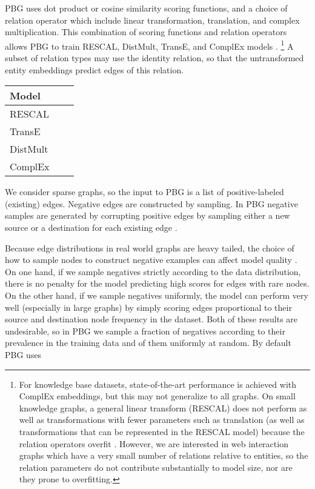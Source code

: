 \documentclass{article}
\begin{document}
PBG uses dot product or cosine similarity scoring functions, and a choice of relation operator  which include linear transformation, translation, and complex multiplication. This combination of scoring functions and relation operators allows PBG to train RESCAL, DistMult, TransE, and ComplEx models \cite{nickel2011three,yang2014embedding,transE,trouillon2016complex}. \footnote{For knowledge base datasets, state-of-the-art performance is achieved with ComplEx embeddings, but this may not generalize to all graphs. On small knowledge graphs, a general linear transform (RESCAL) does not perform as well as transformations with fewer parameters such as translation (as well as transformations that can be represented in the RESCAL model) because the relation operators overfit \cite{hole}. However, we are interested in web interaction graphs which have a very small number of relations relative to entities, so the relation parameters do not contribute substantially to model size, nor are they prone to overfitting.} A subset of relation types may use the identity relation, so that the untransformed entity embeddings predict edges of this relation.

\begin{table}[ht]
\centering
\begin{tabular}{| l | c c | }
\hline
\textbf{Model} &  & \\
\hline
RESCAL &  & \\
TransE &  & \\
DistMult &  &  \\
ComplEx &  &  \\
\hline 
\end{tabular}
\end{table}

We consider sparse graphs, so the input to PBG is a list of positive-labeled (existing) edges. Negative edges are constructed by sampling. In PBG negative samples are generated by corrupting positive edges by sampling either a new source or a destination for each existing edge \cite{transE}.

Because edge distributions in real world graphs are heavy tailed, the choice of how to sample nodes to construct negative examples can affect model quality \cite{mikolov2013efficient}. On one hand, if we sample negatives strictly according to the data distribution, there is no penalty for the model predicting high scores for edges with rare nodes. On the other hand, if we sample negatives uniformly, the model can perform very well (especially in large graphs) by simply scoring edges proportional to their source and destination node frequency in the dataset. Both of these results are undesirable, so in PBG we sample a fraction  of negatives according to their prevalence in the training data and  of them uniformly at random. By default PBG uses  
\end{document}
